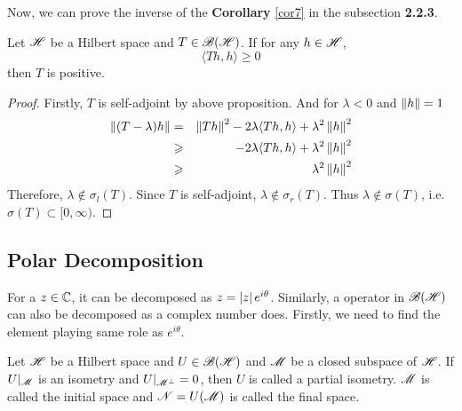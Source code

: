 \documentclass[a4paper,11pt]{report}
\begin{document}
Now, we can prove the inverse of the \textbf{Corollary} \ref{cor7} in the subsection \textbf{2.2.3}.

\begin{thm}
	Let $\mathscr{H}$ be a Hilbert space and $T \in \mathscr{B(H)}$. If for any $h \in \mathscr{H}$, 
	\begin{equation*}
		\langle Th, h \rangle \geqslant 0
	\end{equation*}
	then $T$ is positive.
\end{thm}
\begin{proof}
	Firstly, $T$ is self-adjoint by above proposition. And for $\lambda < 0$ and $\left\lVert h\right\lVert =1$
	\begin{eqnarray*}
		\left\lVert(T-\lambda)h\right\lVert &=& \left\lVert Th\right\lVert^2 - 2\lambda \langle Th,h \rangle + \lambda^2\left\lVert h\right\lVert^2 \\
		&\geqslant& - 2\lambda \langle Th,h \rangle + \lambda^2\left\lVert h\right\lVert^2 \\
		&\geqslant& \lambda^2\left\lVert h\right\lVert^2
	\end{eqnarray*}
	Therefore, $\lambda \notin \sigma_l(T)$. Since $T$ is self-adjoint, $\lambda \notin \sigma_r(T)$. Thus  $\lambda \notin \sigma(T)$, i.e. $\sigma(T) \subset [0,\infty)$.
\end{proof}

\subsection{Polar Decomposition}

For a $z \in \mathbb{C}$, it can be decomposed as $z = \left\lvert z\right\lvert e^{i\theta}$. Similarly, a operator in $\mathscr{B(H)}$ can also be decomposed as a complex number does. Firstly, we need to find the element playing same role as $e^{i\theta}$.

\begin{defn}
	Let $\mathscr{H}$ be a Hilbert space and $U \in \mathscr{B(H)}$ and $\mathscr{M}$ be a closed subspace of $\mathscr{H}$. If $U|_{\mathscr{M}}$ is an isometry and $U|_{\mathscr{M}^{\bot}} = 0$, then $U$ is called a partial isometry. $\mathscr{M}$ is called the initial space and $\mathscr{N}=U(\mathscr{M})$ is called the final space.
\end{defn}
\end{document}
